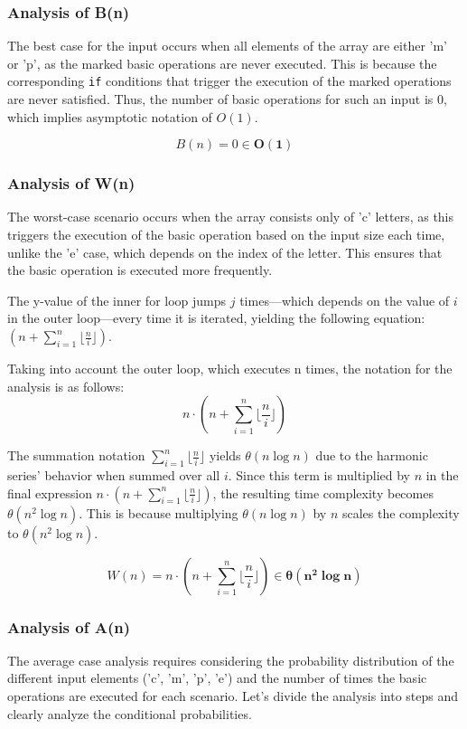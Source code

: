 \documentclass[11pt, oneside, a4paper]{article}
\begin{document}
	\subsubsection{Analysis of B(n)}
The best case for the input occurs when all elements of the array are either 'm' or 'p', as the marked basic operations are never executed. This is because the corresponding \texttt{if} conditions that trigger the execution of the marked operations are never satisfied. Thus, the number of basic operations for such an input is 0, which implies asymptotic notation of $O(1)$.

\[
B(n) = 0 \in \boldsymbol{O(1)}
\]

	\subsubsection{Analysis of W(n)}
 
The worst-case scenario occurs when the array consists only of 'c' letters, as this triggers the execution of the basic operation based on the input size each time, unlike the 'e' case, which depends on the index of the letter. This ensures that the basic operation is executed more frequently.

The y-value of the inner for loop jumps \( j \) times—which depends on the value of \( i \) in the outer loop—every time it is iterated, yielding the following equation: \(( n +  \sum_{i=1}^{n} \lfloor\frac{n}{i} \rfloor)\).


\begin{flushleft}
Taking into account the outer loop, which executes n times, the notation for the analysis is as follows:
\[
n \cdot \left( n +  \sum_{i=1}^{n} \lfloor \frac{n}{i} \rfloor \right)
\]
\end{flushleft}
The summation notation \(\sum_{i=1}^{n} \lfloor \frac{n}{i} \rfloor\) yields \(\theta(n \log n)\) due to the harmonic series' behavior when summed over all \( i \). Since this term is multiplied by \( n \) in the final expression \( n \cdot \left( n + \sum_{i=1}^{n} \lfloor \frac{n}{i} \rfloor \right) \), the resulting time complexity becomes \(\theta(n^2 \log n)\). This is because multiplying \(\theta(n \log n)\) by \( n \) scales the complexity to $\theta(n^2 \log n)$.


\[
W(n) = n \cdot \left( n +  \sum_{i=1}^{n} \lfloor \frac{n}{i} \rfloor \right) \in \boldsymbol{\theta(n^2 \log n)}
\]


	\subsubsection{Analysis of A(n)}
 The average case analysis requires considering the probability distribution of the different input elements ('c', 'm', 'p', 'e') and the number of times the basic operations are executed for each scenario. Let's divide the analysis into steps and clearly analyze the conditional probabilities.
\end{document}
